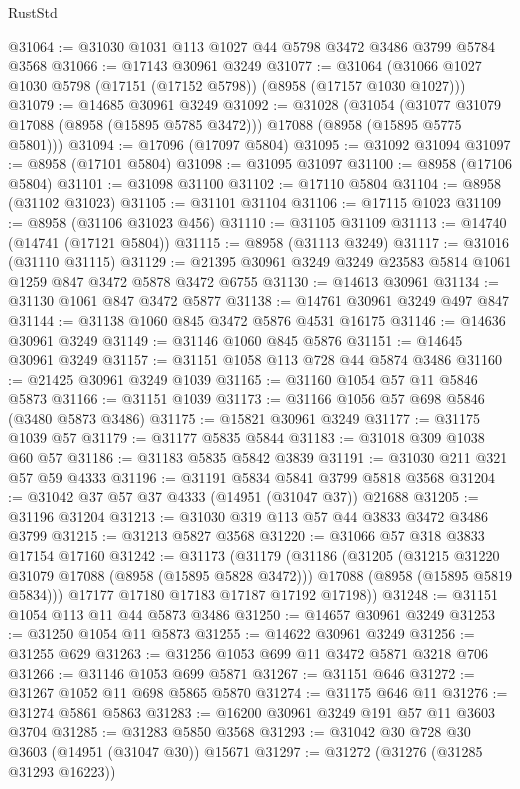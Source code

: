 \begin{lexlean}{RustStd}
\begin{coremodule}
@31064 := @31030 @1031 @113 @1027 @44 @5798 @3472 @3486 @3799 @5784 @3568
@31066 := @17143 @30961 @3249
@31077 := @31064 (@31066 @1027 @1030 @5798 (@17151 (@17152 @5798)) (@8958 (@17157 @1030 @1027)))
@31079 := @14685 @30961 @3249
@31092 := @31028
    (@31054 (@31077 @31079 @17088 (@8958 (@15895 @5785 @3472))) @17088 (@8958 (@15895 @5775 @5801)))
@31094 := @17096 (@17097 @5804)
@31095 := @31092 @31094
@31097 := @8958 (@17101 @5804)
@31098 := @31095 @31097
@31100 := @8958 (@17106 @5804)
@31101 := @31098 @31100
@31102 := @17110 @5804
@31104 := @8958 (@31102 @31023)
@31105 := @31101 @31104
@31106 := @17115 @1023
@31109 := @8958 (@31106 @31023 @456)
@31110 := @31105 @31109
@31113 := @14740 (@14741 (@17121 @5804))
@31115 := @8958 (@31113 @3249)
@31117 := @31016 (@31110 @31115)
@31129 := @21395 @30961 @3249 @3249 @23583 @5814 @1061 @1259 @847 @3472 @5878 @3472 @6755
@31130 := @14613 @30961
@31134 := @31130 @1061 @847 @3472 @5877
@31138 := @14761 @30961 @3249 @497 @847
@31144 := @31138 @1060 @845 @3472 @5876 @4531 @16175
@31146 := @14636 @30961 @3249
@31149 := @31146 @1060 @845 @5876
@31151 := @14645 @30961 @3249
@31157 := @31151 @1058 @113 @728 @44 @5874 @3486
@31160 := @21425 @30961 @3249 @1039
@31165 := @31160 @1054 @57 @11 @5846 @5873
@31166 := @31151 @1039
@31173 := @31166 @1056 @57 @698 @5846 (@3480 @5873 @3486)
@31175 := @15821 @30961 @3249
@31177 := @31175 @1039 @57
@31179 := @31177 @5835 @5844
@31183 := @31018 @309 @1038 @60 @57
@31186 := @31183 @5835 @5842 @3839
@31191 := @31030 @211 @321 @57 @59 @4333
@31196 := @31191 @5834 @5841 @3799 @5818 @3568
@31204 := @31042 @37 @57 @37 @4333 (@14951 (@31047 @37)) @21688
@31205 := @31196 @31204
@31213 := @31030 @319 @113 @57 @44 @3833 @3472 @3486 @3799
@31215 := @31213 @5827 @3568
@31220 := @31066 @57 @318 @3833 @17154 @17160
@31242 := @31173
    (@31179
      (@31186
        (@31205
          (@31215 @31220 @31079 @17088 (@8958 (@15895 @5828 @3472)))
          @17088
          (@8958 (@15895 @5819 @5834)))
        @17177
        @17180
        @17183
        @17187
        @17192
        @17198))
@31248 := @31151 @1054 @113 @11 @44 @5873 @3486
@31250 := @14657 @30961 @3249
@31253 := @31250 @1054 @11 @5873
@31255 := @14622 @30961 @3249
@31256 := @31255 @629
@31263 := @31256 @1053 @699 @11 @3472 @5871 @3218 @706
@31266 := @31146 @1053 @699 @5871
@31267 := @31151 @646
@31272 := @31267 @1052 @11 @698 @5865 @5870
@31274 := @31175 @646 @11
@31276 := @31274 @5861 @5863
@31283 := @16200 @30961 @3249 @191 @57 @11 @3603 @3704
@31285 := @31283 @5850 @3568
@31293 := @31042 @30 @728 @30 @3603 (@14951 (@31047 @30)) @15671
@31297 := @31272 (@31276 (@31285 @31293 @16223))

\end{coremodule}
\end{lexlean}
